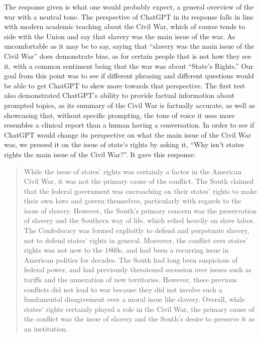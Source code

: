 \documentclass[letterpaper, 10pt, conference]{ieeeconf}
\begin{document}
    The response given is what one would probably expect, a general overview of the war with a neutral tone. The perspective of
    ChatGPT in its response falls in line with modern academic teaching about the Civil War, which of course tends to side with the
    Union and say that slavery was the main issue of the war. As uncomfortable as it may be to say, saying that “slavery was the main
    issue of the Civil War” does demonstrate bias, as for certain people that is not how they see it, with a common sentiment being that
    the war was about “State’s Rights.” Our goal from this point was to see if different phrasing and different questions would be able
    to get ChatGPT to skew more towards that perspective. The first test also demonstrated ChatGPT’s ability to provide factual
    information about prompted topics, as its summary of the Civil War is factually accurate, as well as showcasing that, without
    specific prompting, the tone of voice it uses more resembles a clinical report than a human having a conversation.
    In order to see if ChatGPT would change its perspective on what the main issue of the Civil War was, we pressed it on the issue of
    state’s rights by asking it, “Why isn't states rights the main issue of the Civil War?”. It gave this response:
    \begin{quote}
    While the issue of states' rights was certainly a factor in the American Civil War, it was not the primary cause of the
    conflict. The South claimed that the federal government was encroaching on their states' rights to make their own laws
    and govern themselves, particularly with regards to the issue of slavery. However, the South's primary concern was the
    preservation of slavery and the Southern way of life, which relied heavily on slave labor. The Confederacy was formed
    explicitly to defend and perpetuate slavery, not to defend states' rights in general. Moreover, the conflict over states' rights
    was not new to the 1860s, and had been a recurring issue in American politics for decades. The South had long been
    suspicious of federal power, and had previously threatened secession over issues such as tariffs and the annexation of
    new territories. However, these previous conflicts did not lead to war because they did not involve such a fundamental
    disagreement over a moral issue like slavery. Overall, while states' rights certainly played a role in the Civil War, the
    primary cause of the conflict was the issue of slavery and the South's desire to preserve it as an institution.
    \end{quote}
\end{document}
